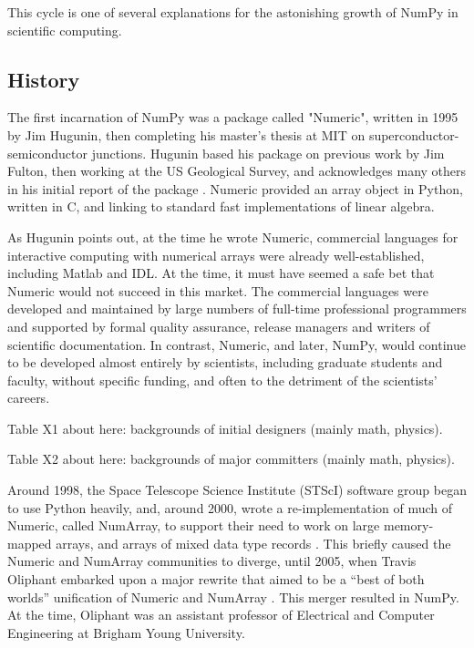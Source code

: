 This cycle is one of several explanations for the astonishing growth of NumPy
in scientific computing.

\subsection{History}

The first incarnation of NumPy was a package called "Numeric", written in 1995
by Jim Hugunin, then completing his master's thesis at MIT on
superconductor-semiconductor junctions.  Hugunin based his package on previous
work by Jim Fulton, then working at the US Geological Survey, and acknowledges
many others in his initial report of the package \cite{Hugunin-whitepaper}.
Numeric provided an array object in Python, written in C, and linking to
standard fast implementations of linear algebra.

As Hugunin points out, at the time he wrote Numeric, commercial languages for
interactive computing with numerical arrays were already well-established,
including Matlab and IDL.  At the time, it must have seemed a safe bet that
Numeric would not succeed in this market.  The commercial languages were
developed and maintained by large numbers of full-time professional programmers
and supported by formal quality assurance, release managers and writers of
scientific documentation.  In contrast, Numeric, and later, NumPy, would
continue to be developed almost entirely by scientists, including graduate
students and faculty, without specific funding, and often to the detriment of
the scientists' careers.

Table X1 about here: backgrounds of initial designers (mainly math, physics).

Table X2 about here: backgrounds of major committers (mainly math, physics).

Around 1998, the Space Telescope Science Institute (STScI) software group began
to use Python heavily, and, around 2000, wrote a re-implementation of much of
Numeric, called NumArray, to support their need to work on large memory-mapped
arrays, and arrays of mixed data type records \cite{STScI-slither}.  This
briefly caused the Numeric and NumArray communities to diverge, until 2005,
when Travis Oliphant embarked upon a major rewrite that aimed to be a ``best of
both worlds'' unification of Numeric and NumArray \cite{oliphant2006guide}.
This merger resulted in NumPy.  At the time, Oliphant was an assistant
professor of Electrical and Computer Engineering at Brigham Young University.

